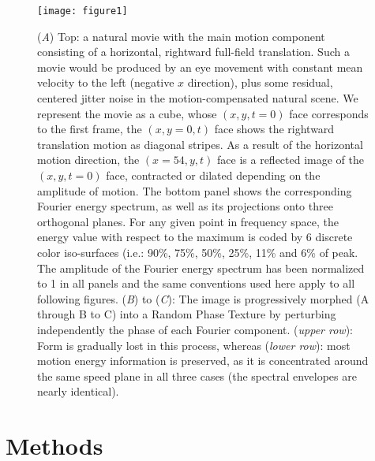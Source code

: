 \documentclass[a4paper,11pt]{article}%
\begin{document}
\begin{figure}%
	\texttt{[image: figure1]}%
	\caption{(\textit{A}) Top: a natural movie with the main motion component consisting of a horizontal, rightward full-field translation. Such a movie would be produced by an eye movement with constant mean velocity to the left (negative $x$ direction), plus some residual, centered jitter noise in the motion-compensated natural scene. We represent the movie as a cube, whose $(x,y,t=0)$ face corresponds to the first frame, the $(x,y=0,t)$ face shows the rightward translation motion as diagonal stripes. As a result of the horizontal motion direction, the $(x=54,y,t)$ face is a reflected image of the $(x,y,t=0)$ face, contracted or dilated depending on the amplitude of motion. The bottom panel shows the corresponding Fourier energy spectrum, as well as its projections onto three orthogonal planes. For any given point in frequency space, the energy value with respect to the maximum is coded by 6 discrete color iso-surfaces (i.e.: 90\%, 75\%, 50\%, 25\%, 11\% and 6\% of peak. The amplitude of the Fourier energy spectrum has been normalized to 1 in all panels and the same conventions used here apply to all following figures. (\textit{B}) to (\textit{C}): The image is progressively morphed (A through B to C) into a Random Phase Texture by perturbing independently the phase of each Fourier component.  (\textit{upper row}): Form is gradually lost in this process, whereas (\textit{lower row}): most motion energy information is preserved, as it is concentrated around the same speed plane in all three cases (the spectral envelopes are nearly identical).}%
	 \label{fig:morphing}%
\end{figure}%

\section{Methods}\label{section:Methods}
\end{document}
